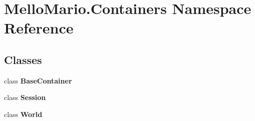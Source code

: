 \section{Mello\+Mario.\+Containers Namespace Reference}
\label{namespaceMelloMario_1_1Containers}
\subsection*{Classes}
\begin{DoxyCompactItemize}
\item 
class \textbf{ Base\+Container}
\item 
class \textbf{ Session}
\item 
class \textbf{ World}
\end{DoxyCompactItemize}
